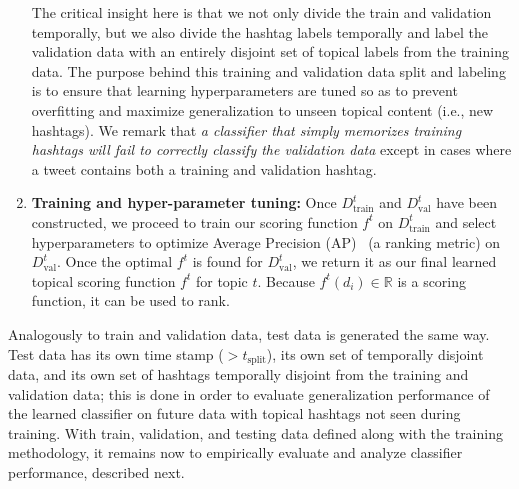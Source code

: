 \begin{enumerate}
The critical insight here is that we not only divide the train and validation
temporally, but we also divide the hashtag labels temporally and label the validation
data with an entirely disjoint set of topical labels from the training data.
The purpose behind this training and validation data split
and labeling is to ensure that learning hyperparameters are tuned so as
to prevent overfitting and maximize generalization to unseen topical
content (i.e., new hashtags).
We remark that \emph{a classifier that simply
memorizes training hashtags will fail to correctly classify the validation data} except in 
cases where a tweet contains both a training and validation hashtag.  
\item {\bf Training and hyper-parameter tuning:}
Once $D^t_\mathrm{train}$ and $D^t_\mathrm{val}$ have been constructed,
we proceed to train our scoring function $f^t$ on $D^t_\mathrm{train}$ and
select hyperparameters to optimize Average Precision (AP)~\cite{manning_ir} (a ranking
metric) on
$D^t_\mathrm{val}$.  Once the optimal $f^t$ is found for $D^t_\mathrm{val}$,
we return it as our final learned topical scoring function $f^t$ for topic $t$.
Because $f^t(d_i) \in \mathbb{R}$ is a scoring function, it can be used to rank.
\end{enumerate}

Analogously to train and validation data, test data is generated the same way.
Test data has its own time stamp ($> t_\mathrm{split}$), its own set of
temporally disjoint data, and its own set of hashtags 
temporally disjoint from the training and validation data; this is done in order to evaluate
generalization performance of the learned classifier on future data with topical hashtags
not seen during training.    
With train, validation, and testing data defined along with the training methodology,
it remains now to empirically evaluate and analyze classifier performance, 
described next.
